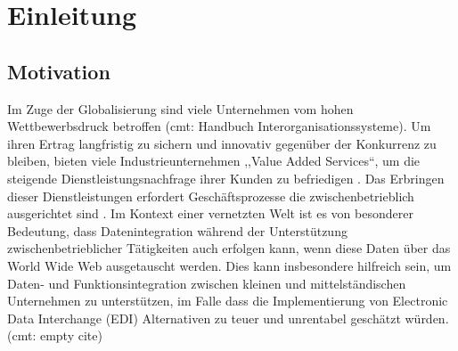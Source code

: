 \section{Einleitung}
\subsection{Motivation}
Im Zuge der Globalisierung sind viele Unternehmen vom hohen Wettbewerbsdruck betroffen (cmt: Handbuch Interorganisationssysteme). Um ihren Ertrag langfristig zu sichern und innovativ gegenüber der Konkurrenz zu bleiben, bieten viele Industrieunternehmen ,,Value Added Services``, um die steigende Dienstleistungsnachfrage ihrer Kunden zu befriedigen \citep[vgl.][S. 4]{Meffert2015}. Das Erbringen dieser Dienstleistungen erfordert Geschäftsprozesse die zwischenbetrieblich ausgerichtet sind \parencite[vgl.][S.19]{fleisch2001netzwerkunternehmen}. Im Kontext einer vernetzten Welt \parencite[vgl.]{bmwi2013} ist es von besonderer Bedeutung, dass Datenintegration während der Unterstützung zwischenbetrieblicher Tätigkeiten auch erfolgen kann, wenn diese Daten über das World Wide Web ausgetauscht werden. Dies kann insbesondere hilfreich sein, um Daten- und Funktionsintegration zwischen kleinen und mittelständischen Unternehmen zu unterstützen, im Falle dass die Implementierung von Electronic Data Interchange (EDI) Alternativen zu teuer und unrentabel geschätzt würden. (cmt: empty cite)

